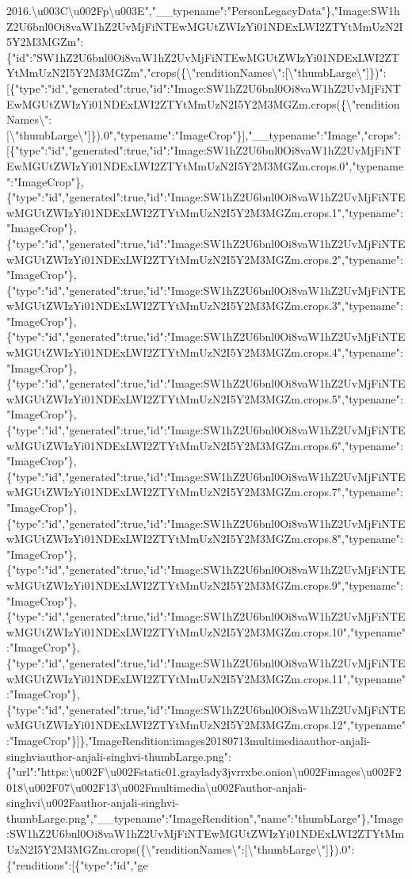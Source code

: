 2016.\textbackslash{}u003C\textbackslash{}u002Fp\textbackslash{}u003E","\_\_typename":"PersonLegacyData"\},"Image:SW1hZ2U6bnl0Oi8vaW1hZ2UvMjFiNTEwMGUtZWIzYi01NDExLWI2ZTYtMmUzN2I5Y2M3MGZm":\{"id":"SW1hZ2U6bnl0Oi8vaW1hZ2UvMjFiNTEwMGUtZWIzYi01NDExLWI2ZTYtMmUzN2I5Y2M3MGZm","crops(\{\textbackslash{}"renditionNames\textbackslash{}":{[}\textbackslash{}"thumbLarge\textbackslash{}"{]}\})":{[}\{"type":"id","generated":true,"id":"Image:SW1hZ2U6bnl0Oi8vaW1hZ2UvMjFiNTEwMGUtZWIzYi01NDExLWI2ZTYtMmUzN2I5Y2M3MGZm.crops(\{\textbackslash{}"renditionNames\textbackslash{}":{[}\textbackslash{}"thumbLarge\textbackslash{}"{]}\}).0","typename":"ImageCrop"\}{]},"\_\_typename":"Image","crops":{[}\{"type":"id","generated":true,"id":"Image:SW1hZ2U6bnl0Oi8vaW1hZ2UvMjFiNTEwMGUtZWIzYi01NDExLWI2ZTYtMmUzN2I5Y2M3MGZm.crops.0","typename":"ImageCrop"\},\{"type":"id","generated":true,"id":"Image:SW1hZ2U6bnl0Oi8vaW1hZ2UvMjFiNTEwMGUtZWIzYi01NDExLWI2ZTYtMmUzN2I5Y2M3MGZm.crops.1","typename":"ImageCrop"\},\{"type":"id","generated":true,"id":"Image:SW1hZ2U6bnl0Oi8vaW1hZ2UvMjFiNTEwMGUtZWIzYi01NDExLWI2ZTYtMmUzN2I5Y2M3MGZm.crops.2","typename":"ImageCrop"\},\{"type":"id","generated":true,"id":"Image:SW1hZ2U6bnl0Oi8vaW1hZ2UvMjFiNTEwMGUtZWIzYi01NDExLWI2ZTYtMmUzN2I5Y2M3MGZm.crops.3","typename":"ImageCrop"\},\{"type":"id","generated":true,"id":"Image:SW1hZ2U6bnl0Oi8vaW1hZ2UvMjFiNTEwMGUtZWIzYi01NDExLWI2ZTYtMmUzN2I5Y2M3MGZm.crops.4","typename":"ImageCrop"\},\{"type":"id","generated":true,"id":"Image:SW1hZ2U6bnl0Oi8vaW1hZ2UvMjFiNTEwMGUtZWIzYi01NDExLWI2ZTYtMmUzN2I5Y2M3MGZm.crops.5","typename":"ImageCrop"\},\{"type":"id","generated":true,"id":"Image:SW1hZ2U6bnl0Oi8vaW1hZ2UvMjFiNTEwMGUtZWIzYi01NDExLWI2ZTYtMmUzN2I5Y2M3MGZm.crops.6","typename":"ImageCrop"\},\{"type":"id","generated":true,"id":"Image:SW1hZ2U6bnl0Oi8vaW1hZ2UvMjFiNTEwMGUtZWIzYi01NDExLWI2ZTYtMmUzN2I5Y2M3MGZm.crops.7","typename":"ImageCrop"\},\{"type":"id","generated":true,"id":"Image:SW1hZ2U6bnl0Oi8vaW1hZ2UvMjFiNTEwMGUtZWIzYi01NDExLWI2ZTYtMmUzN2I5Y2M3MGZm.crops.8","typename":"ImageCrop"\},\{"type":"id","generated":true,"id":"Image:SW1hZ2U6bnl0Oi8vaW1hZ2UvMjFiNTEwMGUtZWIzYi01NDExLWI2ZTYtMmUzN2I5Y2M3MGZm.crops.9","typename":"ImageCrop"\},\{"type":"id","generated":true,"id":"Image:SW1hZ2U6bnl0Oi8vaW1hZ2UvMjFiNTEwMGUtZWIzYi01NDExLWI2ZTYtMmUzN2I5Y2M3MGZm.crops.10","typename":"ImageCrop"\},\{"type":"id","generated":true,"id":"Image:SW1hZ2U6bnl0Oi8vaW1hZ2UvMjFiNTEwMGUtZWIzYi01NDExLWI2ZTYtMmUzN2I5Y2M3MGZm.crops.11","typename":"ImageCrop"\},\{"type":"id","generated":true,"id":"Image:SW1hZ2U6bnl0Oi8vaW1hZ2UvMjFiNTEwMGUtZWIzYi01NDExLWI2ZTYtMmUzN2I5Y2M3MGZm.crops.12","typename":"ImageCrop"\}{]}\},"ImageRendition:images20180713multimediaauthor-anjali-singhviauthor-anjali-singhvi-thumbLarge.png":\{"url":"https:\textbackslash{}u002F\textbackslash{}u002Fstatic01.graylady3jvrrxbe.onion\textbackslash{}u002Fimages\textbackslash{}u002F2018\textbackslash{}u002F07\textbackslash{}u002F13\textbackslash{}u002Fmultimedia\textbackslash{}u002Fauthor-anjali-singhvi\textbackslash{}u002Fauthor-anjali-singhvi-thumbLarge.png","\_\_typename":"ImageRendition","name":"thumbLarge"\},"Image:SW1hZ2U6bnl0Oi8vaW1hZ2UvMjFiNTEwMGUtZWIzYi01NDExLWI2ZTYtMmUzN2I5Y2M3MGZm.crops(\{\textbackslash{}"renditionNames\textbackslash{}":{[}\textbackslash{}"thumbLarge\textbackslash{}"{]}\}).0":\{"renditions":{[}\{"type":"id","ge